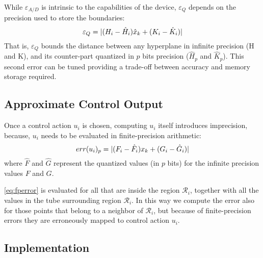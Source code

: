 While $\varepsilon_{A/D}$ is intrinsic to the capabilities of the device,
$\varepsilon_{Q}$ depends on the precision used to store the boundaries:
\begin{equation}\label{eq:quantizationlines}
  \varepsilon_{Q} = |(H_i - \hat{H}_i) \hat{x}_{k} + (K_i - \hat{K}_i)|
\end{equation}
That is, $\varepsilon_{Q}$ bounds the distance between any hyperplane in infinite
precision (H and K), and its counter-part quantized in $p$ bits precision
($\hat{H}_{p}$ and $\hat{K}_{p}$).
This second error can be tuned providing a trade-off between accuracy and
memory storage required.


\subsection{Approximate Control Output}

Once a control action $u_i$ is chosen, computing $u_{i}$ itself introduces
imprecision, because, $u_i$ needs to be evaluated in finite-precision arithmetic:
\begin{equation}\label{eq:fperror}
  err(u_{i})_{p} = | (F_i - \hat{F}_{i}) x_{k} + ( G_i - \hat{G}_{i} ) |
\end{equation}
where $\hat{F}$ and $\hat{G}$ represent the quantized values (in $p$ bits) for
the infinite precision values $F$ and $G$.

\autoref{eq:fperror} is evaluated for all \statevarmath that are inside the
region $\mathcal{R}_i$, together with all the values in the tube surrounding
region $\mathcal{R}_i$.
In this way we compute the error also for those points that belong to a neighbor
of $\mathcal{R}_i$, but because of finite-precision errors they are erroneously
mapped to control action $u_i$.


\subsection{Implementation}


